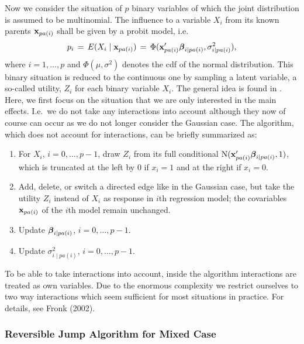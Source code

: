 Now we consider the situation of $p$ binary variables of which the
joint distribution is assumed to be multinomial. The influence to
a variable $X_i$ from its known parents $\mathbf{x}_{pa(i)}$ shall be
given by a probit model, i.e.~
\begin{eqnarray} \label{probit}
p_{i} \,=\,  E(X_{i} \mid \xvec_{pa(i)})
      \,=\,  \Phi (  \xvec_{pa(i)}'\mbeta_{i \mid pa(i)}, \sigma_{i \mid pa(i)}^2),
\end{eqnarray}
where $i=1, \dots , p$ and  $\Phi (\mu ,\sigma^2)$ denotes the cdf
of the normal distribution. This binary situation is reduced to
the continuous one by sampling a latent variable, a so-called
utility, $Z_i$ for each binary variable $X_i$. The general idea is
found in . Here, we first focus on the
situation that we are only interested in the main effects. I.e.~we
do not take any interactions into account although they now of
course can occur as we do not longer consider the Gaussian case.
The algorithm, which does not account for interactions, can be
briefly summarized as:
%
\begin{enumerate}
\item  For $X_i$, $i=0, \dots, p-1$, draw $Z_{i}$ from its full conditional
        $\mbox{N}(\mathbf{x}_{pa(i)}' \mbox{\boldmath $\beta$}_{i \mid pa(i)},1)$, which is truncated at the left by 0 if $x_{i}=1$
        and at the  right if $x_{i}=0$.
\item Add, delete, or switch a directed edge like in the Gaussian case, but take the utility $Z_i$ instead of
$X_i$ as response in $i$th regression model; the covariables
$\mathbf{x}_{pa(i)}$ of the $i$th model remain unchanged.
\item Update  $\mbox{\boldmath $\beta$}_{i\mid pa(i)}$, $i=0, \dots, p-1$.
\item Update $\sigma^2_{i\mid pa(i)}$, $i=0, \dots, p-1$.
\end{enumerate}

To be able to take interactions into account, inside the algorithm
interactions are treated as own variables. Due to the enormous
complexity we restrict ourselves to two way interactions which
seem sufficient for most situations in practice. For details, see
Fronk (2002).

\subsubsection*{Reversible Jump Algorithm for Mixed Case}

